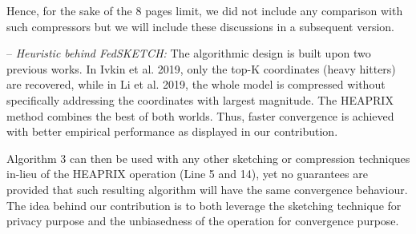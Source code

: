 \documentclass{article}
\begin{document}
Hence, for the sake of the 8 pages limit, we did not include any comparison with such compressors but we will include these discussions in a subsequent version. 

-- \textit{Heuristic behind FedSKETCH:} 
The algorithmic design is built upon two previous works. 
In Ivkin et al. 2019, only the top-K coordinates (heavy hitters) are recovered, while in Li et al. 2019, the whole model is compressed without specifically addressing the coordinates with largest magnitude. 
The HEAPRIX method combines the best of both worlds. 
Thus, faster convergence is achieved with better empirical performance as displayed in our contribution.

Algorithm 3 can then be used with any other sketching or compression techniques in-lieu of the HEAPRIX operation (Line 5 and 14), yet no guarantees are provided that such resulting algorithm will have the same convergence behaviour.
The idea behind our contribution is to both leverage the sketching technique for privacy purpose and the unbiasedness of the operation for convergence purpose.
\end{document}
